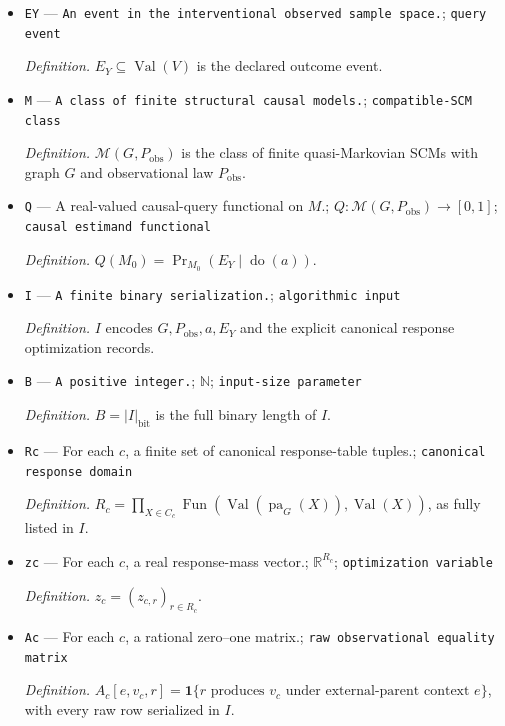 \documentclass{article}
\begin{document}
\begin{itemize}
  \item \texttt{EY} --- \texttt{An event in the interventional observed sample space.}; \texttt{query event}
  \par\smallskip\noindent\emph{Definition.} \(E_Y\subseteq\operatorname{Val}(V)\) is the declared outcome event.
  \item \texttt{M} --- \texttt{A class of finite structural causal models.}; \texttt{compatible-\allowbreak{}SCM class}
  \par\smallskip\noindent\emph{Definition.} \(\mathcal M(G,P_{\mathrm{obs}})\) is the class of finite quasi-Markovian SCMs with graph \(G\) and observational law \(P_{\mathrm{obs}}\).
  \item \texttt{Q} --- A real-valued causal-query functional on \(M\).; \(Q:\mathcal M(G,P_{\mathrm{obs}})\to[0,1]\); \texttt{causal estimand functional}
  \par\smallskip\noindent\emph{Definition.} \(Q(M_0)=\Pr_{M_0}(E_Y\mid\operatorname{do}(a))\).
  \item \texttt{I} --- \texttt{A finite binary serialization.}; \texttt{algorithmic input}
  \par\smallskip\noindent\emph{Definition.} \(I\) encodes \(G,P_{\mathrm{obs}},a,E_Y\) and the explicit canonical response optimization records.
  \item \texttt{B} --- \texttt{A positive integer.}; \(\mathbb N\); \texttt{input-\allowbreak{}size parameter}
  \par\smallskip\noindent\emph{Definition.} \(B=|I|_{\mathrm{bit}}\) is the full binary length of \(I\).
  \item \texttt{Rc} --- For each \(c\), a finite set of canonical response-table tuples.; \texttt{canonical response domain}
  \par\smallskip\noindent\emph{Definition.} \(R_c=\prod_{X\in C_c}\operatorname{Fun}(\operatorname{Val}(\operatorname{pa}_G(X)),\operatorname{Val}(X))\), as fully listed in \(I\).
  \item \texttt{zc} --- For each \(c\), a real response-mass vector.; \(\mathbb R^{R_c}\); \texttt{optimization variable}
  \par\smallskip\noindent\emph{Definition.} \(z_c=(z_{c,r})_{r\in R_c}\).
  \item \texttt{Ac} --- For each \(c\), a rational zero--one matrix.; \texttt{raw observational equality matrix}
  \par\smallskip\noindent\emph{Definition.} \(A_c[e,v_c,r]=\mathbf 1\{r\text{ produces }v_c\text{ under external-parent context }e\}\), with every raw row serialized in \(I\).

\end{itemize}
\end{document}
